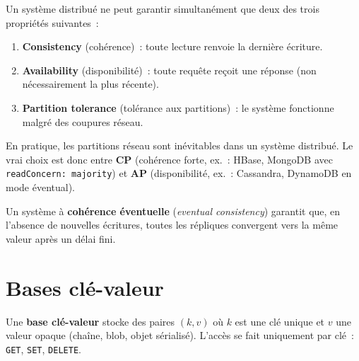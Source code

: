 \begin{theoreme}
Un syst\`eme distribu\'e ne peut garantir simultan\'ement que deux des
trois propri\'et\'es suivantes~:
\begin{enumerate}
  \item \textbf{Consistency} (coh\'erence)~: toute lecture renvoie la
        derni\`ere \'ecriture.
  \item \textbf{Availability} (disponibilit\'e)~: toute requ\^ete re\c{c}oit
        une r\'eponse (non n\'ecessairement la plus r\'ecente).
  \item \textbf{Partition tolerance} (tol\'erance aux partitions)~: le
        syst\`eme fonctionne malgr\'e des coupures r\'eseau.
\end{enumerate}
\end{theoreme}

\begin{attention}
En pratique, les partitions r\'eseau sont in\'evitables dans un syst\`eme
distribu\'e. Le vrai choix est donc entre \textbf{CP} (coh\'erence forte,
ex.~: HBase, MongoDB avec \texttt{readConcern: majority}) et \textbf{AP}
(disponibilit\'e, ex.~: Cassandra, DynamoDB en mode \'eventual).
\end{attention}

\begin{definition}
Un syst\`eme \`a \textbf{coh\'erence \'eventuelle} (\emph{eventual consistency})
garantit que, en l'absence de nouvelles \'ecritures, toutes les r\'epliques
convergent vers la m\^eme valeur apr\`es un d\'elai fini.
\end{definition}

\section{Bases cl\'e-valeur}

\begin{definition}
Une \textbf{base cl\'e-valeur} stocke des paires $(k, v)$ o\`u $k$ est
une cl\'e unique et $v$ une valeur opaque (cha\^ine, blob, objet s\'erialis\'e).
L'acc\`es se fait uniquement par cl\'e~: \texttt{GET}, \texttt{SET},
\texttt{DELETE}.
\end{definition}

